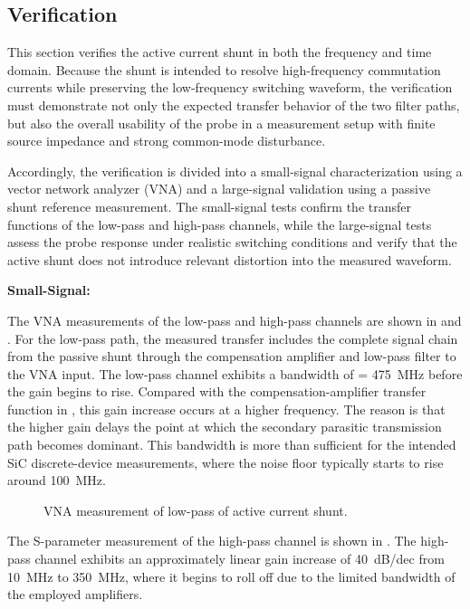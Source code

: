 

\subsection{Verification}

This section verifies the active current shunt in both the frequency and time domain.
Because the shunt is intended to resolve high-frequency commutation currents while preserving the low-frequency switching waveform, the verification must demonstrate not only the expected transfer behavior of the two filter paths, but also the overall usability of the probe in a measurement setup with finite source impedance and strong common-mode disturbance.

Accordingly, the verification is divided into a small-signal characterization using a vector network analyzer (VNA) and a large-signal validation using a passive shunt reference measurement.
The small-signal tests confirm the transfer functions of the low-pass and high-pass channels, while the large-signal tests assess the probe response under realistic switching conditions and verify that the active shunt does not introduce relevant distortion into the measured waveform.

\textbf{Small-Signal:}

The VNA measurements of the low-pass and high-pass channels are shown in  and .
For the low-pass path, the measured transfer includes the complete signal chain from the passive shunt through the compensation amplifier and low-pass filter to the VNA input.
The low-pass channel exhibits a bandwidth of  = \SI{475}{MHz} before the gain begins to rise.
Compared with the compensation-amplifier transfer function in , this gain increase occurs at a higher frequency.
The reason is that the higher gain delays the point at which the secondary parasitic transmission path becomes dominant.
This bandwidth is more than sufficient for the intended SiC discrete-device measurements, where the noise floor typically starts to rise around \SI{100}{MHz}.
	
\begin{figure}[ht]
	\centering
	
	\caption{VNA measurement of low-pass of active current shunt.}\label{fig:VNA_Shunt_LP}
\end{figure}

The S-parameter measurement of the high-pass channel is shown in .
The high-pass channel exhibits an approximately linear gain increase of \SI{+40}{dB/dec} from \SI{10}{MHz} to \SI{350}{MHz}, where it begins to roll off due to the limited bandwidth of the employed amplifiers.

